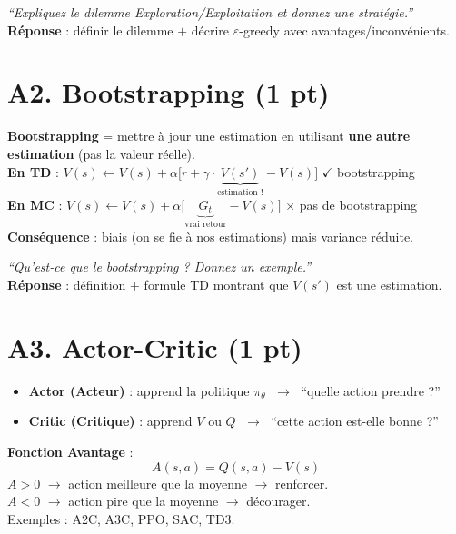 \documentclass[11pt,a4paper]{article}
\begin{document}
\begin{exambox}
\textit{``Expliquez le dilemme Exploration/Exploitation et donnez une stratégie.''}\\[4pt]
\textbf{Réponse} : définir le dilemme $+$ décrire $\varepsilon$-greedy avec avantages/inconvénients.
\end{exambox}

\section{A2. Bootstrapping (1 pt)}

\begin{formbox}[Définition]
\textbf{Bootstrapping} = mettre à jour une estimation en utilisant \textbf{une autre estimation} (pas la valeur réelle).\\[4pt]
\textbf{En TD} : $V(s) \leftarrow V(s) + \alpha\big[r + \gamma \cdot \underbrace{V(s')}_{\text{estimation !}} - V(s)\big]$ \quad $\checkmark$ bootstrapping\\[4pt]
\textbf{En MC} : $V(s) \leftarrow V(s) + \alpha\big[\underbrace{G_t}_{\text{vrai retour}} - V(s)\big]$ \quad $\times$ pas de bootstrapping\\[4pt]
\textbf{Conséquence} : biais (on se fie à nos estimations) mais variance réduite.
\end{formbox}

\begin{exambox}
\textit{``Qu'est-ce que le bootstrapping ? Donnez un exemple.''}\\[4pt]
\textbf{Réponse} : définition + formule TD montrant que $V(s')$ est une estimation.
\end{exambox}

\section{A3. Actor-Critic (1 pt)}

\begin{formbox}
\begin{itemize}[nosep]
\item \textbf{Actor (Acteur)} : apprend la politique $\pi_\theta$ $\;\to\;$ ``quelle action prendre ?''
\item \textbf{Critic (Critique)} : apprend $V$ ou $Q$ $\;\to\;$ ``cette action est-elle bonne ?''
\end{itemize}
\vspace{4pt}
\textbf{Fonction Avantage} :
$$A(s, a) = Q(s, a) - V(s)$$
$A > 0$ $\to$ action meilleure que la moyenne $\to$ renforcer.\\
$A < 0$ $\to$ action pire que la moyenne $\to$ décourager.\\[4pt]
Exemples : A2C, A3C, PPO, SAC, TD3.
\end{formbox}
\end{document}
